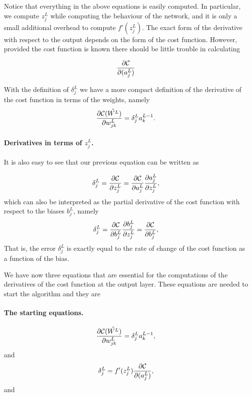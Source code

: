 \documentclass[%
oneside,                 %
final,                   %
10pt]{article}
\begin{document}
Notice that everything in the above equations is easily computed.  In
particular, we compute $z_j^L$ while computing the behaviour of the
network, and it is only a small additional overhead to compute
$f'(z^L_j)$.  The exact form of the derivative with respect to the
output depends on the form of the cost function.
However, provided the cost function is known there should be little
trouble in calculating

\[
\frac{\partial {\cal C}}{\partial (a_j^L)}
\]

With the definition of $\delta_j^L$ we have a more compact definition of the derivative of the cost function in terms of the weights, namely
\[
\frac{\partial{\cal C}(\hat{W^L})}{\partial w_{jk}^L}  =  \delta_j^La_k^{L-1}.
\]


\paragraph{Derivatives in terms of $z_j^L$.}
It is also easy to see that our previous equation can be written as

\[
\delta_j^L =\frac{\partial {\cal C}}{\partial z_j^L}= \frac{\partial {\cal C}}{\partial a_j^L}\frac{\partial a_j^L}{\partial z_j^L},
\]
which can also be interpreted as the partial derivative of the cost function with respect to the biases $b_j^L$, namely
\[
\delta_j^L = \frac{\partial {\cal C}}{\partial b_j^L}\frac{\partial b_j^L}{\partial z_j^L}=\frac{\partial {\cal C}}{\partial b_j^L},
\]
That is, the error $\delta_j^L$ is exactly equal to the rate of change of the cost function as a function of the bias. 


We have now three equations that are essential for the computations of the derivatives of the cost function at the output layer. These equations are needed to start the algorithm and they are


\paragraph{The starting equations.}

\begin{equation}
\frac{\partial{\cal C}(\hat{W^L})}{\partial w_{jk}^L}  =  \delta_j^La_k^{L-1},
\end{equation}
and
\begin{equation}
\delta_j^L = f'(z_j^L)\frac{\partial {\cal C}}{\partial (a_j^L)},
\end{equation}
and
\end{document}
